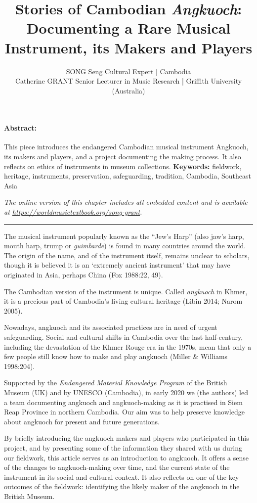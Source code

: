 \documentclass[twoside]{article}
\title{Stories of Cambodian \emph{Angkuoch}: Documenting a Rare Musical Instrument, its Makers and Players}
\author{SONG Seng Cultural Expert | Cambodia\\Catherine GRANT Senior Lecturer in Music Research | Griffith University (Australia)}
\date{}
\makeatletter
\renewcommand{\maketitle}{\bgroup\setlength{\parindent}{0pt}
\begin{flushleft}
  \vspace*{3\baselineskip}
  \huge{\textbf{\@title}}

  \medskip
  
  \large{\@author}
\end{flushleft}\egroup
}
\providecommand{\keywords}[1]
{
  \newline
  \textbf{Keywords:} #1
}
\providecommand{\wmturl}{\href{https://worldmusictextbook.org/song-grant}{https://worldmusictextbook.org/song-grant}}
\providecommand{\wmturltext}{
  \noindent\emph{The online version of this chapter includes all embedded content and is available at \wmturl.}
}
\makeatother
\begin{document}
\suppressfloats %
\maketitle

\paragraph{Abstract:}
This piece introduces the endangered Cambodian musical instrument Angkuoch, its makers and players, and a project documenting the making process. It also reflects on ethics of instruments in museum collections.\keywords{fieldwork, heritage, instruments, preservation, safeguarding, tradition, Cambodia, Southeast Asia}

\smallskip

\wmturltext

\medskip

\noindent\hfil\rule{0.5\textwidth}{0.4pt}\hfil

\bigskip

The musical instrument popularly known as the ``Jew's Harp'' (also jaw's
harp, mouth harp, trump or \emph{guimbarde}) is found in many countries
around the world. The origin of the name, and of the instrument itself,
remains unclear to scholars, though it is believed it is an `extremely
ancient instrument' that may have originated in Asia, perhaps China (Fox
1988:22, 49).

The Cambodian version of the instrument is unique. Called
\emph{angkuoch} in Khmer, it is a precious part of Cambodia's living
cultural heritage (Libin 2014; Narom 2005).

Nowadays, angkuoch and its associated practices are in need of urgent
safeguarding. Social and cultural shifts in Cambodia over the last
half-century, including the devastation of the Khmer Rouge era in the
1970s, mean that only a few people still know how to make and play
angkuoch (Miller \& Williams 1998:204).

Supported by the \emph{Endangered Material Knowledge Program} of the
British Museum (UK) and by UNESCO (Cambodia), in early 2020 we (the
authors) led a team documenting angkuoch and angkuoch-making as it is
practised in Siem Reap Province in northern Cambodia. Our aim was to
help preserve knowledge about angkuoch for present and future
generations.

By briefly introducing the angkuoch makers and players who participated
in this project, and by presenting some of the information they shared
with us during our fieldwork, this article serves as an introduction to
angkuoch. It offers a sense of the changes to angkuoch-making over time,
and the current state of the instrument in its social and cultural
context. It also reflects on one of the key outcomes of the fieldwork:
identifying the likely maker of the angkuoch in the British Museum.
\end{document}
